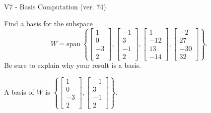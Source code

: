 \begin{exercise}
  \begin{exerciseTitle}V7 - Basis Computation (ver. 74)\end{exerciseTitle}
  \begin{exerciseStatement}
    Find a basis for the subspace 
\[W=\mathrm{span}\ \left\{\left[\begin{array}{r}
1 \\
0 \\
-3 \\
2
\end{array}\right] , \left[\begin{array}{r}
-1 \\
3 \\
-1 \\
2
\end{array}\right] , \left[\begin{array}{r}
1 \\
-12 \\
13 \\
-14
\end{array}\right] , \left[\begin{array}{r}
-2 \\
27 \\
-30 \\
32
\end{array}\right]\right\}.\]
 Be sure to explain why your result is a basis.


  \end{exerciseStatement}
  \begin{exerciseAnswer}
   A basis of \(W\) is  \(\left\{\left[\begin{array}{r}
1 \\
0 \\
-3 \\
2
\end{array}\right] , \left[\begin{array}{r}
-1 \\
3 \\
-1 \\
2
\end{array}\right]\right\}\).
  


  \end{exerciseAnswer}
\end{exercise}